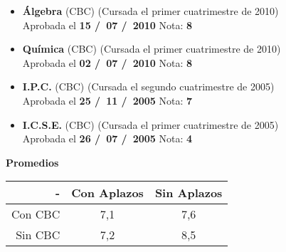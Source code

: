 \begin{itemize}[leftmargin=0.8cm]
    \item{\textbf{Álgebra} (CBC) (Cursada el primer cuatrimestre de 2010)\\
    Aprobada el \textbf{15 \slash \ 07 \slash \ 2010} \hfill Nota: \textbf{8}}

    \item{\textbf{Química} (CBC) (Cursada el primer cuatrimestre de 2010)\\
    Aprobada el \textbf{02 \slash \ 07 \slash \ 2010} \hfill Nota: \textbf{8}}

    \item{\textbf{I.P.C.} (CBC) (Cursada el segundo cuatrimestre de 2005)\\
    Aprobada el \textbf{25 \slash \ 11 \slash \ 2005} \hfill Nota: \textbf{7}}

    \item{\textbf{I.C.S.E.} (CBC) (Cursada el primer cuatrimestre de 2005)\\
    Aprobada el \textbf{26 \slash \ 07 \slash \ 2005} \hfill Nota: \textbf{4}}

  \end{itemize}

\begin{center}
\textbf{Promedios}

  \begin{tabular}{|r|c|c|}
    \hline
    - & Con Aplazos & Sin Aplazos \\
    \hline
    Con CBC & 7,1 & 7,6 \\
    \hline
    Sin CBC & 7,2 & 8,5 \\
    \hline
  \end{tabular}

\end{center}
